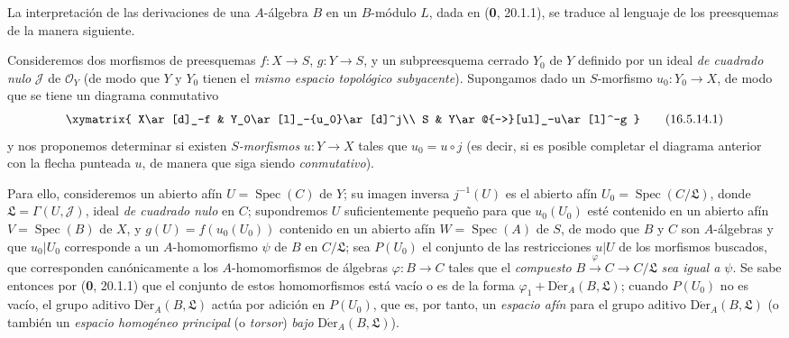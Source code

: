 \begin{env}[16.5.14]
\label{IV.16.5.14}
La interpretación de las derivaciones de una $A$-álgebra $B$ en un $B$-módulo
$L$, dada en (\textbf 0, 20.1.1), se traduce al lenguaje de los preesquemas de la
manera siguiente.

Consideremos dos morfismos de preesquemas $f:X\to S$, $g:Y\to S$, y un
subpreesquema cerrado $Y_0$ de $Y$ definido por un ideal \emph{de cuadrado nulo}
$\mathscr{J}$ de $\mathcal{O}_Y$ (de modo que $Y$ y $Y_0$ tienen el
\emph{mismo espacio topológico subyacente}). Supongamos dado un $S$-morfismo
$u_0:Y_0\to X$, de modo que se tiene un diagrama conmutativo
\[
  \xymatrix{
    X\ar[d]_-f & Y_0\ar[l]_-{u_0}\ar[d]^j\\
    S & Y\ar@{-->}[ul]_-u\ar[l]^-g
  }
  \tag{16.5.14.1}
  \label{IV.16.5.14.1}
\]
y nos proponemos determinar si existen \emph{$S$-morfismos}
$u:Y\to X$ tales que $u_0=u\circ j$ (es decir, si es posible
completar el diagrama anterior con la flecha punteada $u$, de manera que siga
siendo \emph{conmutativo}).

Para ello, consideremos un abierto afín $U=\operatorname{Spec}(C)$ de $Y$;
su imagen inversa $j^{-1}(U)$ es el abierto afín
$U_0=\operatorname{Spec}(C/\mathfrak{L})$, donde
$\mathfrak{L}=\Gamma(U,\mathscr{J})$, ideal \emph{de cuadrado nulo} en $C$;
supondremos $U$ suficientemente pequeño para que $u_0(U_0)$ esté contenido en un
abierto afín $V=\operatorname{Spec}(B)$ de $X$, y
$g(U)=f(u_0(U_0))$ contenido en un abierto afín
$W=\operatorname{Spec}(A)$ de $S$, de modo que $B$ y $C$ son
$A$-álgebras y que $u_0|U_0$ corresponde a un $A$-homomorfismo $\psi$ de
$B$ en $C/\mathfrak{L}$; sea $P(U_0)$ el conjunto de las restricciones $u|U$
de los morfismos buscados, que corresponden canónicamente a los
$A$-homomorfismos de álgebras $\varphi:B\to C$ tales que el \emph{compuesto}
$B\xrightarrow{\varphi}C\to C/\mathfrak{L}$
\emph{sea igual a $\psi$}. Se sabe entonces por (\textbf 0, 20.1.1) que el conjunto de estos
homomorfismos está vacío o es de la forma
$\varphi_1+\operatorname{D\acute{e}r}_A(B,\mathfrak{L})$; cuando $P(U_0)$ no es
vacío, el grupo aditivo $\operatorname{D\acute{e}r}_A(B,\mathfrak{L})$ actúa por
adición en $P(U_0)$, que es, por tanto, un \emph{espacio afín} para el grupo
aditivo $\operatorname{D\acute{e}r}_A(B,\mathfrak{L})$ (o también un
\emph{espacio homogéneo principal} (o \emph{torsor}) \emph{bajo}
$\operatorname{D\acute{e}r}_A(B,\mathfrak{L})$).


\end{env}
